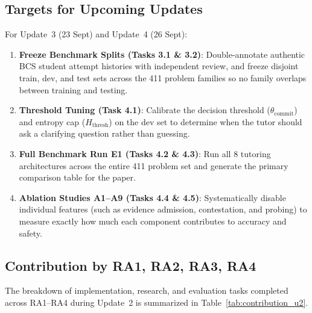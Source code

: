 \documentclass[lettersize,onecolumn,journal]{IEEEtran}
\begin{document}
\subsection{Targets for Upcoming Updates}

For Update~3 (23 Sept) and Update~4 (26 Sept):
\begin{enumerate}
    \item \textbf{Freeze Benchmark Splits (Tasks 3.1 \& 3.2)}: Double-annotate authentic BCS student attempt histories with independent review, and freeze disjoint train, dev, and test sets across the 411 problem families so no family overlaps between training and testing.
    \item \textbf{Threshold Tuning (Task 4.1)}: Calibrate the decision threshold ($\theta_{\text{commit}}$) and entropy cap ($H_{\text{thresh}}$) on the dev set to determine when the tutor should ask a clarifying question rather than guessing.
    \item \textbf{Full Benchmark Run E1 (Tasks 4.2 \& 4.3)}: Run all 8 tutoring architectures across the entire 411 problem set and generate the primary comparison table for the paper.
    \item \textbf{Ablation Studies A1--A9 (Tasks 4.4 \& 4.5)}: Systematically disable individual features (such as evidence admission, contestation, and probing) to measure exactly how much each component contributes to accuracy and safety.
\end{enumerate}

\clearpage
\subsection{Contribution by RA1, RA2, RA3, RA4}

The breakdown of implementation, research, and evaluation tasks completed across RA1--RA4 during Update~2 is summarized in Table~\ref{tab:contribution_u2}.
\end{document}
